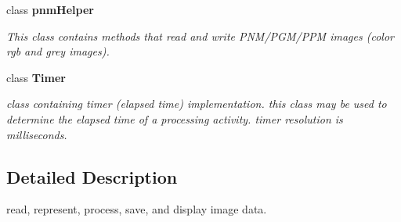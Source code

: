 \begin{CompactItemize}
class {\bf pnm\-Helper}
\begin{CompactList}\small\item\em This class contains methods that read and write PNM/PGM/PPM images (color rgb and grey images). \item\end{CompactList}\item 
class {\bf Timer}
\begin{CompactList}\small\item\em class containing timer (elapsed time) implementation. this class may be used to determine the elapsed time of a processing activity. timer resolution is milliseconds. \item\end{CompactList}\end{CompactItemize}


\subsection{Detailed Description}
read, represent, process, save, and display image data. 
